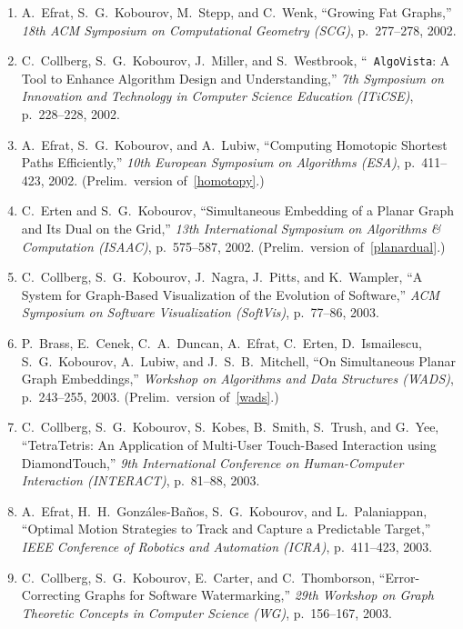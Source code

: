 \documentclass[10pt]{article}
\begin{document}
\begin{description}
\begin{enumerate}
\item 
A.~Efrat, S.~G.~Kobourov, M.~Stepp, and C.~Wenk, ``Growing Fat
Graphs,'' {\em 18th ACM Symposium on Computational Geometry (SCG)},
p.~277--278, 2002.

\item 
C.~Collberg, S.~G.~Kobourov, J.~Miller, and S.~Westbrook, ``{\tt
AlgoVista}: A Tool to Enhance Algorithm Design and Understanding,''
{\em 7th Symposium on Innovation and Technology in
Computer Science Education (ITiCSE)}, p.~228--228, 2002.

\item 
A.~Efrat, S.~G.~Kobourov, and A.~Lubiw, ``Computing Homotopic Shortest
Paths Efficiently,'' {\em 10th European Symposium on Algorithms (ESA)},
p.~411--423, 2002. (Prelim.~version of~\ref{homotopy}.)

\item 
C.~Erten and S.~G.~Kobourov, ``Simultaneous Embedding of a Planar
Graph and Its Dual on the Grid,'' {\em 13th International Symposium on Algorithms
\& Computation (ISAAC)}, p.~575--587, 2002. (Prelim.~version of~\ref{planardual}.)

\item 
C.~Collberg, S.~G.~Kobourov, J.~Nagra, J.~Pitts, and K.~Wampler, ``A
System for Graph-Based Visualization of the Evolution of Software,''
{\em ACM Symposium on Software Visualization (SoftVis)}, p.~77--86, 2003.
      
\item 
P.~Brass, E.~Cenek, C.~A.~Duncan, A.~Efrat, C.~Erten, D.~Ismailescu,
S.~G.~Kobourov, A.~Lubiw, and J.~S.~B.~Mitchell, ``On Simultaneous
Planar Graph Embeddings,'' {\em Workshop on Algorithms and Data
Structures (WADS)}, p.~243--255, 2003. (Prelim.~version of~\ref{wads}.)

\item 
C.~Collberg, S.~G.~Kobourov, S.~Kobes, B.~Smith, S.~Trush, and G.~Yee,
``TetraTetris: An Application of Multi-User Touch-Based Interaction
using DiamondTouch,'' {\em 9th International Conference on
Human-Computer Interaction (INTERACT)}, p.~81--88, 2003.

\item 
A.~Efrat, H.~H.~Gonz{\'a}les-Ba{\~n}os, S.~G.~Kobourov, and
L.~Palaniappan, ``Optimal Motion Strategies to Track and Capture a
Predictable Target,'' {\em IEEE Conference of Robotics and Automation (ICRA)}, p.~411--423, 2003.

\item 
C.~Collberg, S.~G.~Kobourov, E.~Carter, and C.~Thomborson,
``Error-Correcting Graphs for Software Watermarking,'' {\em 29th
Workshop on Graph Theoretic Concepts in Computer Science (WG)}, p.~156--167, 2003.


\end{enumerate}
\end{description}
\end{document}
